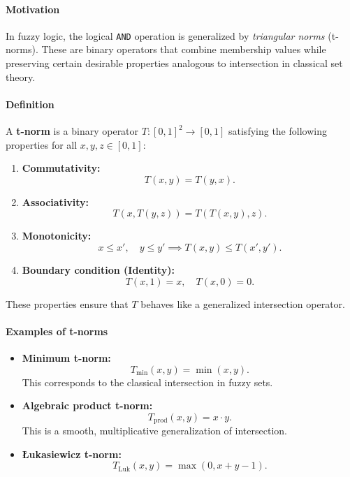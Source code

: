 \paragraph{Motivation}
In fuzzy logic, the logical \texttt{AND} operation is generalized by \emph{triangular norms} (t\hyp{}norms). These are binary operators that combine membership values while preserving certain desirable properties analogous to intersection in classical set theory.

\paragraph{Definition}
A \textbf{t\hyp{}norm} is a binary operator \( T: [0,1]^2 \to [0,1] \) satisfying the following properties for all \( x, y, z \in [0,1] \):

\begin{enumerate}
    \item \textbf{Commutativity:}
    \[
        T(x, y) = T(y, x).
    \]
    \item \textbf{Associativity:}
    \[
        T(x, T(y, z)) = T(T(x, y), z).
    \]
    \item \textbf{Monotonicity:}
    \[
        x \leq x', \quad y \leq y' \implies T(x, y) \leq T(x', y').
    \]
    \item \textbf{Boundary condition (Identity):}
    \[
        T(x,1) = x, \quad T(x,0) = 0.
    \]
\end{enumerate}

These properties ensure that \( T \) behaves like a generalized intersection operator.

\paragraph{Examples of t\hyp{}norms}

\begin{itemize}
    \item \textbf{Minimum t\hyp{}norm:}
    \[
        T_{\min}(x, y) = \min(x, y).
    \]
    This corresponds to the classical intersection in fuzzy sets.

    \item \textbf{Algebraic product t\hyp{}norm:}
    \[
        T_{\text{prod}}(x, y) = x \cdot y.
    \]
    This is a smooth, multiplicative generalization of intersection.

    \item \textbf{{\L}ukasiewicz t\hyp{}norm:}
    \[
        T_{\text{Luk}}(x, y) = \max(0, x + y - 1).
    \]
\end{itemize}

